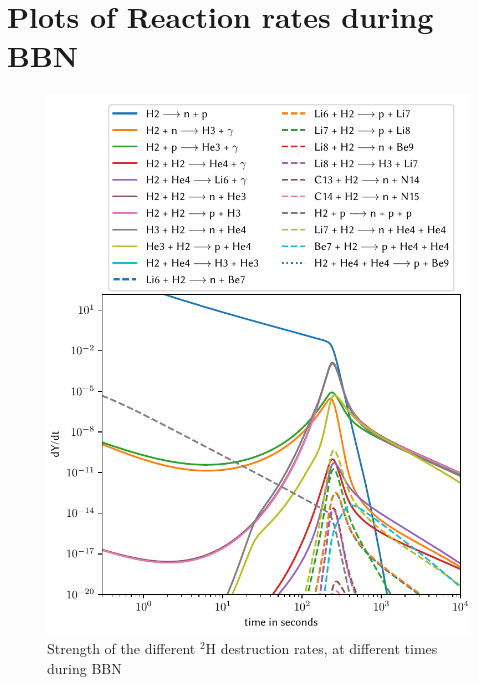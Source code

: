 \chapter{Plots of Reaction rates during BBN}
\label{chap:more_plots}

\begin{figure}[ht]
    \includegraphics[width=5.1in]{figures/app/H2destruct.pdf}
    \caption{Strength of the different ${}^2$H destruction rates, at different times during BBN}
    \label{fig:H2destruct}
\end{figure}


